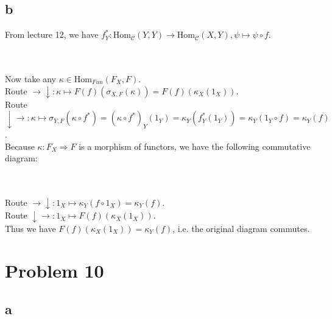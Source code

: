 \documentclass{article}
\newcommand{\CCC}{\mathcal{C}}
\newcommand{\Hom}{\text{Hom}}
\begin{document}
\subsection{b}

From lecture 12, we have $f^*_Y:\Hom_\CCC(Y,Y)\rightarrow \Hom_\CCC(X,Y),\psi\mapsto \psi\circ f$.\\

\\ \\
Now take any $\kappa\in \Hom_{Fun}(F_X,F)$.\\
Route $\rightarrow\downarrow:\kappa\mapsto F(f)(\sigma_{X,F}(\kappa))=F(f)(\kappa_X(1_X))$.\\
Route $\downarrow\rightarrow:\kappa\mapsto \sigma_{Y,F}(\kappa\circ f^*)=(\kappa\circ f^*)_Y(1_Y)=\kappa_Y(f^*_Y(1_Y))=\kappa_Y(1_Y\circ f)=\kappa_Y(f)$.\\
Because $\kappa:F_X\Rightarrow F$ is a morphism of functors, we have the following commutative diagram:\\

\\ \\
Route $\rightarrow\downarrow:1_X\mapsto \kappa_Y(f\circ 1_X)=\kappa_Y(f)$.\\
Route $\downarrow\rightarrow:1_X\mapsto F(f)(\kappa_X(1_X))$.\\
Thus we have $F(f)(\kappa_X(1_X))=\kappa_Y(f)$, i.e. the original diagram commutes.

\section{Problem 10}

\subsection{a}
\end{document}

